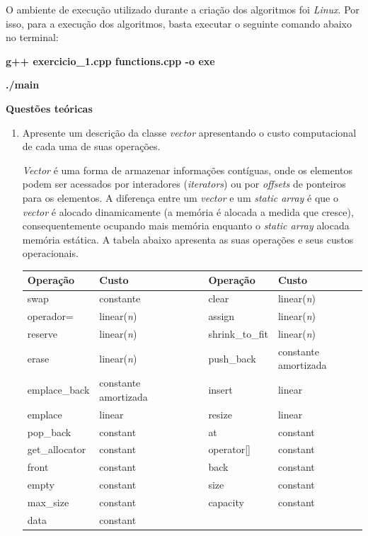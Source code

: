 \documentclass[12pt,a4paper]{article}
\begin{document}
O ambiente de execução utilizado durante a criação dos algoritmos foi \textit{Linux}. Por isso, para a execução dos algoritmos, basta executar o seguinte comando abaixo no terminal:

\textbf{g++ exercicio\_1.cpp functions.cpp -o exe}

\textbf{./main}

\vspace{1cm}

{\Large \textbf{Questões teóricas}}

\begin{enumerate}
	\item Apresente um descrição da classe \textit{vector} apresentando o custo computacional de cada uma de suas operações.
	
	\textit{Vector} é uma forma de armazenar informações contíguas, onde os elementos podem ser acessados por interadores (\textit{iterators}) ou por \textit{offsets} de ponteiros para os elementos. A diferença entre um \textit{vector} e um \textit{static array} é que o \textit{vector} é alocado dinamicamente (a memória é alocada a medida que cresce), consequentemente ocupando mais memória enquanto o \textit{static array} alocada memória estática. A tabela abaixo apresenta as suas operações e seus custos operacionais.
	
	\begin{table}[H]
		\centering
		\begin{tabular}{llccll}
			\toprule
			\textbf{Operação} & \textbf{Custo} &&& \textbf{Operação} & \textbf{Custo}\\
			\midrule
			swap & constante &&& clear & linear(\textit{n})\\
			operador= & linear(\textit{n}) &&& assign & linear(\textit{n})\\
			reserve & linear(\textit{n}) &&& shrink\_to\_fit & linear(\textit{n})\\
			erase & linear(\textit{n}) &&& push\_back & constante amortizada\\
			emplace\_back & constante amortizada &&& insert & linear\\
			emplace & linear &&& resize & linear\\
			pop\_back & constant &&& at & constant\\
			get\_allocator & constant &&& operator[] & constant\\
			front & constant &&& back & constant\\
			empty & constant &&& size & constant\\
			max\_size & constant &&& capacity & constant\\
			data & constant\\		
			
			\bottomrule			
		\end{tabular}
	\end{table}
	
	
	
\end{enumerate}


\end{document}
